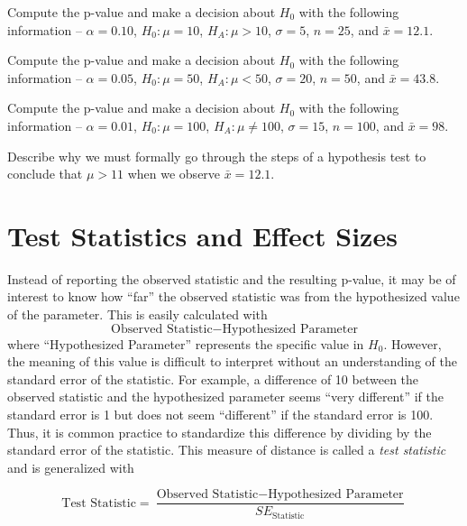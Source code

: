 \documentclass[10pt,openany]{book}\usepackage[]{graphicx}\usepackage[]{color}
\begin{document}
\begin{exsection}
  \item \label{revex:HypTCalc1} Compute the p-value and make a decision about $H_{0}$ with the following information -- $\alpha=0.10$, $H_{0}:\mu=10$, $H_{A}:\mu>10$, $\sigma=5$, $n=25$, and $\bar{x}=12.1$. 
  \item \label{revex:HypTCalc2} Compute the p-value and make a decision about $H_{0}$ with the following information -- $\alpha=0.05$, $H_{0}:\mu=50$, $H_{A}:\mu<50$, $\sigma=20$, $n=50$, and $\bar{x}=43.8$. 
  \item \label{revex:HypTCalc3}  Compute the p-value and make a decision about $H_{0}$ with the following information -- $\alpha=0.01$, $H_{0}:\mu=100$, $H_{A}:\mu\neq100$, $\sigma=15$, $n=100$, and $\bar{x}=98$. 
  \item \label{revex:HypTWhy} Describe why we must formally go through the steps of a hypothesis test to conclude that $\mu>11$ when we observe $\bar{x}=12.1$. 
\end{exsection}


\section{Test Statistics and Effect Sizes}
\vspace{-12pt}
Instead of reporting the observed statistic and the resulting p-value, it may be of interest to know how ``far'' the observed statistic was from the hypothesized value of the parameter.  This is easily calculated with
\[ \text{Observed Statistic}-\text{Hypothesized Parameter} \]
where ``Hypothesized Parameter'' represents the specific value in $H_{0}$.  However, the meaning of this value is difficult to interpret without an understanding of the standard error of the statistic.  For example, a difference of 10 between the observed statistic and the hypothesized parameter seems ``very different'' if the standard error is 1 but does not seem ``different'' if the standard error is 100.  Thus, it is common practice to standardize this difference by dividing by the standard error of the statistic.  This measure of distance is called a \emph{test statistic} and is generalized with

\begin{equation}  \label{eqn:zTestStatGeneral}
  \text{Test Statistic} = \frac{\text{Observed Statistic}-\text{Hypothesized Parameter}}{SE_{\text{Statistic}}}
\end{equation}
\end{document}
